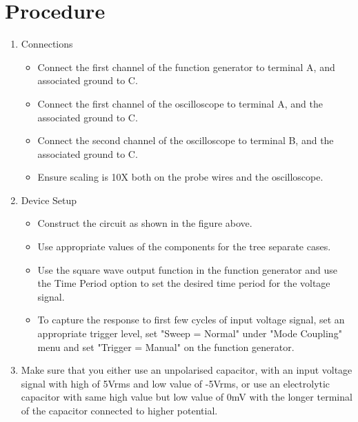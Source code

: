 \documentclass[a4paper,12pt]{article}
\begin{document}
\section{Procedure}
\begin{enumerate}
\item Connections
\begin{itemize}
\item Connect the first channel of the function generator to terminal A, and associated ground to C.
\item Connect the first channel of the oscilloscope to terminal A, and the associated ground to C.
\item Connect the second channel of the oscilloscope to terminal B, and the associated ground to C.
\item Ensure scaling is 10X both on the probe wires and the oscilloscope.
\end{itemize}
\item Device Setup
\begin{itemize}
\item Construct the circuit as shown in the figure above.
\item Use appropriate values of the components for the tree separate cases.
\item Use the square wave output function in the function generator and use the Time Period option to set the desired time period for the voltage signal.
\item To capture the response to first few cycles of input voltage signal, set an appropriate trigger level, set "Sweep = Normal" under "Mode Coupling" menu and set "Trigger = Manual" on the function generator.
\end{itemize}
\item Make sure that you either use an unpolarised capacitor, with an input voltage signal with
  high of 5Vrms and low value of -5Vrms, or use an electrolytic capacitor with same high value but 
  low value of 0mV with the longer terminal of the capacitor connected to higher potential.
\end{enumerate}
\end{document}
